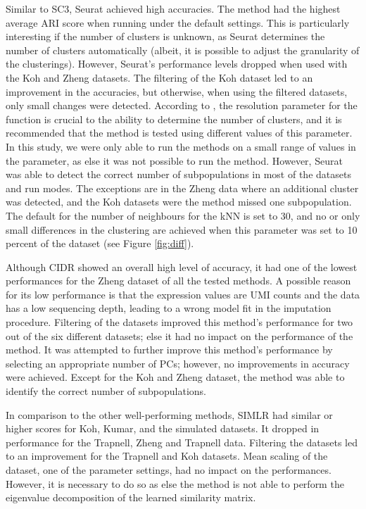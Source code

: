 \documentclass[12pt, a4paper]{article}\usepackage[]{graphicx}\usepackage[]{color}
\begin{document}
Similar to SC3, Seurat achieved high accuracies. The method had the highest average ARI score when running under the default settings. This is particularly interesting if the number of clusters is unknown, as Seurat determines the number of clusters automatically (albeit, it is possible to adjust the granularity of the clusterings). However, Seurat’s performance levels dropped when used with the Koh and Zheng datasets. The filtering of the Koh dataset led to an improvement in the accuracies, but otherwise, when using the filtered datasets, only small changes were detected. According to \citet{butler2017integrated}, the resolution parameter for the function is crucial to the ability to determine the number of clusters, and it is recommended that the method is tested using different values of this parameter. In this study, we were only able to run the methods on a small range of values in the parameter, as else it was not possible to run the method. However, Seurat was able to detect the correct number of subpopulations in most of the datasets and run modes. The exceptions are in the Zheng data where an additional cluster was detected, and the Koh datasets were the method missed one subpopulation. The default for the number of neighbours for the kNN is set to 30, and no or only small differences in the clustering are achieved when this parameter was set to 10 percent of the dataset (see Figure \ref{fig:diff}). 

Although CIDR showed an overall high level of accuracy, it had one of the lowest performances for the Zheng dataset of all the tested methods. A possible reason for its low performance is that the expression values are UMI counts and the data has a low sequencing depth, leading to a wrong model fit in the imputation procedure. Filtering of the datasets improved this method’s performance for two out of the six different datasets; else it had no impact on the performance of the method. It was attempted to further improve this method’s performance by selecting an appropriate number of PCs; however, no improvements in accuracy were achieved. Except for the Koh and Zheng dataset, the method was able to identify the correct number of subpopulations.


In comparison to the other well-performing methods, SIMLR had similar or higher scores for Koh, Kumar, and the simulated datasets. It dropped in performance for the Trapnell, Zheng and Trapnell data. Filtering the datasets led to an improvement for the Trapnell and Koh datasets. Mean scaling of the dataset, one of the parameter settings,  had no impact on the performances. However, it is necessary to do so as else the method is not able to perform the eigenvalue decomposition of the learned similarity matrix. 
\end{document}
